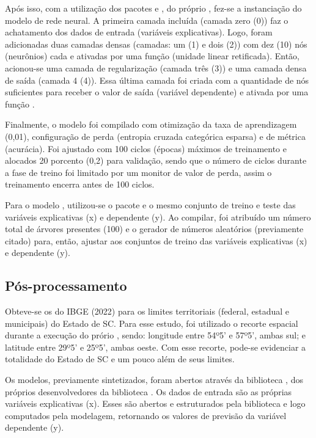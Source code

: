 \indent Após isso, com a utilização dos pacotes  \cite{tensorflow_2015_whitepaper} e  \cite{keras_2015_chollet}, do próprio , fez-se a instanciação do modelo de rede neural. A primeira camada incluída (camada zero (0)) faz o achatamento dos dados de entrada (variáveis explicativas). Logo, foram adicionadas duas camadas densas (camadas: um (1) e dois (2)) com dez (10) nós (neurônios) cada e ativadas por uma função  (unidade linear retificada). Então, acionou-se uma camada de regularização (camada três (3)) e uma camada densa de saída (camada 4 (4)). Essa última camada foi criada com a quantidade de nós suficientes para receber o valor de saída (variável dependente) e ativada por uma função .

\indent Finalmente, o modelo foi compilado com otimização da taxa de aprendizagem (0,01), configuração de perda (entropia cruzada categórica esparsa) e de métrica (acurácia). Foi ajustado com 100 ciclos (épocas) máximos de treinamento e alocados 20 porcento (0,2) para validação, sendo que o número de ciclos durante a fase de treino foi limitado por um monitor de valor de perda, assim o treinamento encerra antes de 100 ciclos.

\indent Para o modelo , utilizou-se o pacote  e o mesmo conjunto de treino e teste das variáveis explicativas (x) e dependente (y). Ao compilar, foi atribuído um número total de árvores presentes (100) e o gerador de números aleatórios (previamente citado) para, então, ajustar aos conjuntos de treino das variáveis explicativas (x) e dependente (y).

\subsection{Pós-processamento}

\indent Obteve-se os  do \acrshort{IBGE} (2022) para os limites territoriais (federal, estadual e municipais) do Estado de \acrlong{SC}. Para esse estudo, foi utilizado o recorte espacial durante a execução do prório , sendo: longitude entre 54º5' e 57º5', ambas sul; e latitude entre 29º5' e 25º5', ambas oeste. Com esse recorte, pode-se evidenciar a totalidade do Estado de \acrlong{SC} e um pouco além de seus limites.

\indent Os modelos, previamente sintetizados, foram abertos através da biblioteca , dos próprios desenvolvedores da biblioteca . Os dados de entrada são as próprias variáveis explicativas (x). Esses são abertos e estruturados pela biblioteca  e logo computados pela modelagem, retornando os valores de previsão da variável dependente (y).

